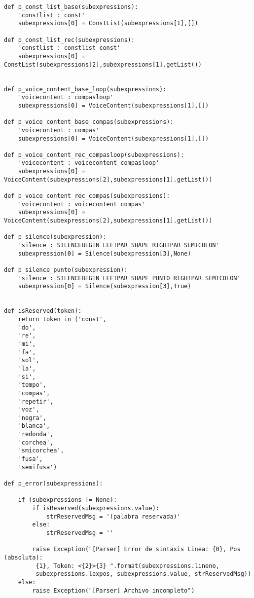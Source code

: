 \begin{verbatim}
def p_const_list_base(subexpressions):
    'constlist : const'
    subexpressions[0] = ConstList(subexpressions[1],[])

def p_const_list_rec(subexpressions):
    'constlist : constlist const'
    subexpressions[0] = ConstList(subexpressions[2],subexpressions[1].getList())


def p_voice_content_base_loop(subexpressions):
    'voicecontent : compasloop'
    subexpressions[0] = VoiceContent(subexpressions[1],[])

def p_voice_content_base_compas(subexpressions):
    'voicecontent : compas'
    subexpressions[0] = VoiceContent(subexpressions[1],[])

def p_voice_content_rec_compasloop(subexpressions):
    'voicecontent : voicecontent compasloop'
    subexpressions[0] = VoiceContent(subexpressions[2],subexpressions[1].getList())

def p_voice_content_rec_compas(subexpressions):
    'voicecontent : voicecontent compas'
    subexpressions[0] = VoiceContent(subexpressions[2],subexpressions[1].getList())

def p_silence(subexpression):
    'silence : SILENCEBEGIN LEFTPAR SHAPE RIGHTPAR SEMICOLON'
    subexpression[0] = Silence(subexpression[3],None)

def p_silence_punto(subexpression):
    'silence : SILENCEBEGIN LEFTPAR SHAPE PUNTO RIGHTPAR SEMICOLON'
    subexpression[0] = Silence(subexpression[3],True)


def isReserved(token):
    return token in ('const',
    'do',
    're',
    'mi',
    'fa',
    'sol',
    'la',
    'si',
    'tempo',
    'compas',
    'repetir',
    'voz',
    'negra',
    'blanca',
    'redonda',
    'corchea',
    'smicorchea',
    'fusa',
    'semifusa')

def p_error(subexpressions):

    if (subexpressions != None):
        if isReserved(subexpressions.value):
            strReservedMsg = '(palabra reservada)'
        else:
            strReservedMsg = ''

        raise Exception("[Parser] Error de sintaxis Linea: {0}, Pos (absoluta):
         {1}, Token: <{2}>{3} ".format(subexpressions.lineno,
         subexpressions.lexpos, subexpressions.value, strReservedMsg))
    else:
        raise Exception("[Parser] Archivo incompleto")
\end{verbatim}